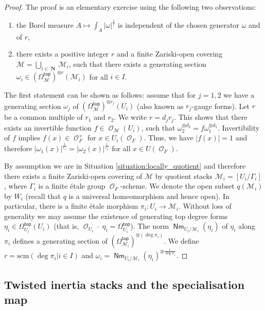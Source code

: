 \documentclass{article}
\DeclareMathOperator{\Nb}{\mathbf{N}}
\newcommand{\Mc}{\mathcal{M}}
\DeclareMathOperator{\Oo}{\mathcal{O}}
\renewcommand{\top}{\mathsf{top}}
\DeclareMathOperator{\Nm}{\mathsf{Nm}}
\theoremstyle{definition}
\theoremstyle{plain}
\begin{document}
\begin{proof}
The proof is an elementary exercise using the following two observations:
\begin{enumerate}[(1)]
\item the Borel measure $A \mapsto \int_{A} |\omega|^{\frac{1}{r}}$ is independent of the chosen generator $\omega$ and of $r$, 
\item there exists a positive integer $r$ and a finite Zariski-open covering $\Mc = \bigcup_{i \in \Nb} \Mc_i$, such that there exists a generating section $\omega_i \in (\Omega^{\top}_{\Mc})^{\otimes r}(\Mc_i)$ for all $i \in I$.
\end{enumerate}
The first statement can be shown as follows: assume that for $j= 1,2$ we have a generating section $\omega_j$ of $(\Omega^{\top}_{\Mc})^{\otimes r_j}(U_i)$ (also known as $r_j$-gauge forms).  Let $r$ be a common multiple of $r_1$ and $r_2$. We write $r = d_j r_j$. This shows that there exists an invertible function $f \in \Oo_{\Mc}(U_i)$, such that $\omega_2^{\otimes d_2} = f \omega_1^{\otimes d_1}$. Invertibility of $f$ implies $f(x) \in \Oo_F^{\times}$ for $x \in U_i(\Oo_F)$. Thus, we have $|f(x)| = 1$ and therefore $|\omega_1(x)|^{\frac{1}{r_1}} = |\omega_2(x)|^{\frac{1}{r_2}}$ for all $x \in U(\Oo_F)$. 

By assumption we are in Situation \ref{situation:locally_quotient} and therefore there exists a finite Zariski-open covering of $\Mc$ by quotient stacks $\mathcal{M}_i = [U_i/\Gamma_i]$, where $\Gamma_i$ is a finite \'etale group $\Oo_F$-scheme. We denote the open subset $q(\mathcal{M}_i)$ by $W_i$ (recall that $q$ is a universal homeomorphism and hence open). In particular, there is a finite \'etale morphism $\pi_i\colon U_i \to \mathcal{M}_i$. Without loss of generality we may assume the existence of generating top degree forms $\eta_i \in \Omega_{U_i}^{\top}(U_i)$ (that is, $\Oo_{U_i}\cdot{ } \; \eta_i = \Omega_{U_i}^{\top}$). The norm $\Nm_{U_i/\mathcal{M}_i}(\eta_i)$ of $\eta_i$ along $\pi_i$ defines a generating section of $(\Omega_{\mathcal{M}_i}^{\top})^{\otimes (\deg \pi_i)}$. We define $r = \mathrm{scm}(\deg \pi_i|i \in I)$ and $\omega_i = \Nm_{U_i/\mathcal{M}_i}(\eta_i)^{\otimes \frac{r}{\deg \pi_i}}$.
\end{proof}



\subsection{Twisted inertia stacks and the specialisation map}
\end{document}
